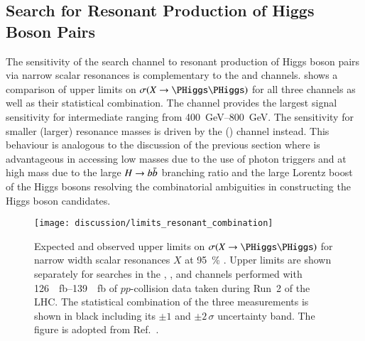

\subsection{Search for Resonant Production of Higgs Boson Pairs}

The sensitivity of the \bbtautau search channel to resonant production
of Higgs boson pairs via narrow scalar resonances is complementary to
the \bbyy and \bbbb channels.  shows
a comparison of upper limits on $\sigma(X \to \HH)$ for all three
channels as well as their statistical combination. The \bbtautau
channel provides the largest signal sensitivity for intermediate \mX
ranging from \SIrange{400}{800}{\GeV}. The sensitivity for smaller
(larger) resonance masses is driven by the \bbyy (\bbbb) channel
instead. This behaviour is analogous to the discussion of the previous
section where \bbyy is advantageous in accessing low masses due to the
use of photon triggers and \bbbb at high mass due to the large
$H \to b\bar{b}$ branching ratio and the large Lorentz boost of the
Higgs bosons resolving the combinatorial ambiguities in constructing
the Higgs boson candidates.

\begin{figure}[htbp]
  \centering

  \texttt{[image: discussion/limits\_resonant\_combination]}

  \caption{Expected and observed upper limits on $\sigma(X \to \HH)$
    for narrow width scalar resonances $X$ at \SI{95}{\percent}
    \CLs. Upper limits are shown separately for searches in the \bbbb,
    \bbtautau, and \bbyy channels performed with
    \SIrange{126}{139}{\per\femto\barn} of $pp$-collision data taken
    during Run~2 of the LHC. The statistical combination of the three
    measurements is shown in black including its $\pm 1$ and
    $\pm 2\,\sigma$ uncertainty band. The figure is adopted from
    Ref.~\cite{ATLAS-CONF-2021-052}.}
  \label{fig:resonant_hh_comb_limits}
\end{figure}


